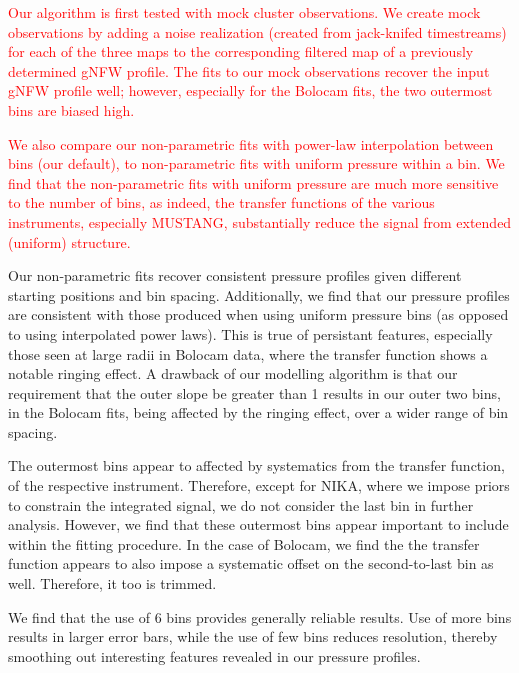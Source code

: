 \documentclass[twocolumn,traditabstract]{aa}
\begin{document}
\textcolor{red}{
  Our algorithm is first tested with mock cluster observations. We create mock observations by adding
  a noise realization (created from jack-knifed timestreams) for each of the three maps to the
  corresponding filtered map of a previously determined \citep{romero2016} gNFW profile. The fits to
  our mock observations recover the input gNFW profile well; however, especially for the Bolocam
  fits, the two outermost bins are biased high.}

\textcolor{red}{We also compare our non-parametric fits with power-law interpolation between bins
  (our default), to non-parametric fits with uniform pressure within a bin.
  We find that the non-parametric fits with uniform
  pressure are much more sensitive to the number of bins, as indeed, the transfer functions of the
  various instruments, especially MUSTANG, substantially reduce the signal from extended (uniform)
  structure.}

Our non-parametric fits recover consistent pressure profiles given different starting positions and bin spacing.
Additionally, we find that our pressure profiles are consistent with those produced when using uniform pressure
bins (as opposed to using interpolated power laws). This is true of persistant features, especially those seen
at large radii in Bolocam data, where the transfer function shows a notable ringing effect. A drawback of our
modelling algorithm is that our requirement that the outer slope be greater than 1 results in our outer two bins,
in the Bolocam fits, being affected by the ringing effect, over a wider range of bin spacing. 

The outermost bins appear to affected by systematics from the transfer function, of the respective instrument.
Therefore, except for NIKA, where we impose priors to constrain the integrated signal, we do not consider the
last bin in further analysis. However, we find that these outermost bins appear important to include within the
fitting procedure. In the case of Bolocam, we find the the transfer function appears to also impose a systematic
offset on the second-to-last bin as well. Therefore, it too is trimmed.

We find that the use of 6 bins provides generally reliable results. Use of more bins results in larger error bars, while
the use of few bins reduces resolution, thereby smoothing out interesting features revealed in our pressure profiles.
\end{document}
